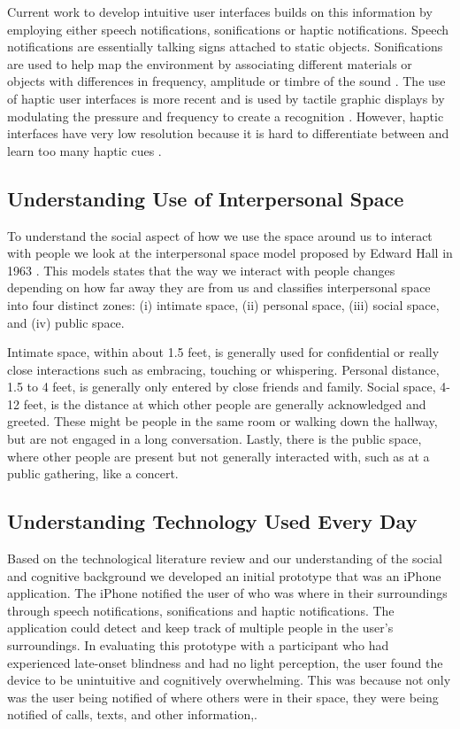 Current work to develop intuitive user interfaces builds on this information by employing either speech notifications, sonifications or haptic notifications. Speech notifications are essentially talking signs attached to static objects. Sonifications are used to help map the environment by associating different materials or objects with differences in frequency, amplitude or timbre of the sound \cite{brock2013supporting,massof2003auditory,striem2014visual}. The use of haptic user interfaces is more recent and is used by tactile graphic displays by modulating the pressure and frequency to create a recognition \cite{lahav2008haptic,belardinelli2009sonification}. However, haptic interfaces have very low resolution because it is hard to differentiate between and learn too many haptic cues \cite{lahav2008haptic}. 

\subsection{Understanding Use of Interpersonal Space}
To understand the social aspect of how we use the space around us to interact with people we look at the interpersonal space model proposed by Edward Hall in 1963 \cite{hall1963system}. This models states that the way we interact with people changes depending on how far away they are from us and classifies interpersonal space into four distinct zones: (i) intimate space, (ii) personal space, (iii) social space, and (iv) public space.

Intimate space, within about 1.5 feet, is generally used for confidential or really close interactions such as embracing, touching or whispering. Personal distance,  1.5 to 4 feet, is generally only entered by close friends and family.  Social space, 4-12 feet, is the distance at which other people are generally acknowledged and greeted. These might be people in the same room or walking down the hallway, but are not engaged in a long conversation. Lastly, there is the public space, where other people are present but not generally interacted with, such as at a public gathering, like a concert. 

\subsection{Understanding Technology Used Every Day }
Based on the technological literature review and our understanding of the social and cognitive background we developed an initial prototype that was an iPhone application. The iPhone notified the user of who was where in their surroundings through speech notifications, sonifications and haptic notifications. The application could detect and keep track of multiple people in the user's surroundings.  In evaluating this prototype with a participant who had experienced late-onset blindness and had no light perception, the user found the device to be unintuitive and cognitively overwhelming. This was because not only was the user being notified of where others were in their space, they were being notified of calls, texts, and other information,. 

